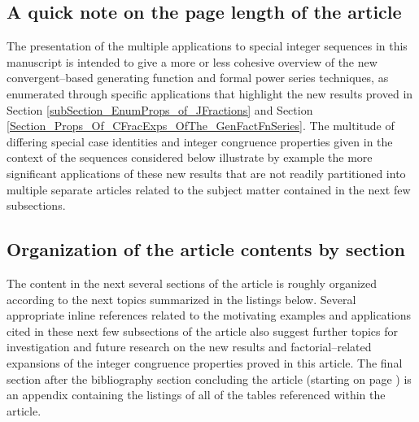 \documentclass[12pt,reqno]{article}
\numberwithin{sfootnote}{section}
\numberwithin{equation}{section}
\theoremstyle{plain}
\theoremstyle{definition}
\theoremstyle{remark}
\begin{document}
\subsection{A quick note on the page length of the article} 

The presentation of the multiple applications to 
special integer sequences in this manuscript is intended to give a 
more or less cohesive overview of the 
new convergent--based generating function and formal power series 
techniques, as enumerated through specific applications that 
highlight the new results proved in 
Section \ref{subSection_EnumProps_of_JFractions} and 
Section \ref{Section_Props_Of_CFracExps_OfThe_GenFactFnSeries}. 
The multitude of differing special case identities and 
integer congruence properties given in the context of the sequences 
considered below illustrate by example the 
more significant applications of these new results that 
are not readily partitioned into multiple separate articles 
related to the subject matter contained in the next few subsections. 

\subsection{Organization of the article contents by section} 

The content in the next several sections of the article is 
roughly organized according to the 
next topics summarized in the listings below. 
Several appropriate inline references related to the motivating examples and 
applications cited in these next few subsections of the article 
also suggest further topics for investigation and future research 
on the new results and factorial--related expansions of the 
integer congruence properties proved in this article. 
The final section after the bibliography section concluding the article 
(starting on page \pageref{page_StartOfTableData}) 
is an appendix containing the listings of all of the 
tables referenced within the article. 
\end{document}
